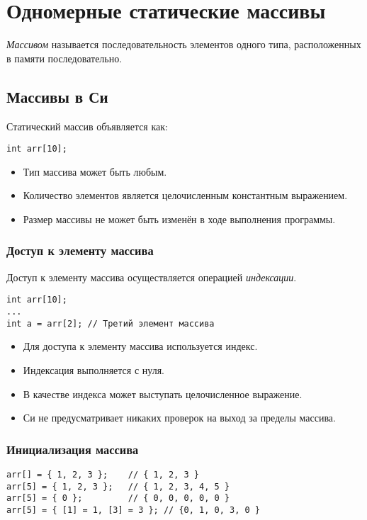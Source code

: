 \section{Одномерные статические массивы}

\begin{definition}
  \textit{Массивом} называется последовательность элементов одного типа, расположенных в памяти последовательно.
\end{definition}

\subsection{Массивы в Си}

Статический массив объявляется как:
\begin{verbatim}
int arr[10];
\end{verbatim}

\begin{itemize}
  \item Тип массива может быть любым.
  \item Количество элементов является целочисленным константным выражением.
  \item Размер массивы не может быть изменён в ходе выполнения программы.
\end{itemize}

\subsubsection{Доступ к элементу массива}

Доступ к элементу массива осуществляется операцией \textit{индексации}.

\begin{verbatim}
int arr[10];
...
int a = arr[2]; // Третий элемент массива
\end{verbatim}

\begin{itemize}
  \item Для доступа к элементу массива используется индекс.
  \item Индексация выполняется с нуля.
  \item В качестве индекса может выступать целочисленное выражение.
  \item Си не предусматривает никаких проверок на выход за пределы массива.
\end{itemize}

\subsubsection{Инициализация массива}

\begin{verbatim}
arr[] = { 1, 2, 3 };    // { 1, 2, 3 }
arr[5] = { 1, 2, 3 };   // { 1, 2, 3, 4, 5 }
arr[5] = { 0 };         // { 0, 0, 0, 0, 0 }
arr[5] = { [1] = 1, [3] = 3 }; // {0, 1, 0, 3, 0 }
\end{verbatim}

